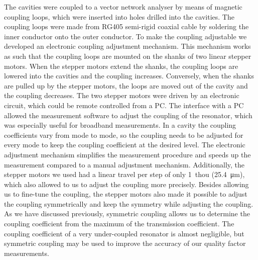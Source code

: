 The cavities were coupled to a vector network analyser by means of magnetic coupling loops, which were inserted into holes drilled into the cavities. The coupling loops were made from RG405 semi-rigid coaxial cable by soldering the inner conductor onto the outer conductor. To make the coupling adjustable we developed an electronic coupling adjustment mechanism. This mechanism works as such that the coupling loops are mounted on the shanks of two linear stepper motors. When the stepper motors extend the shanks, the coupling loops are lowered into the cavities and the coupling increases. Conversely, when the shanks are pulled up by the stepper motors, the loops are moved out of the cavity and the coupling decreases. The two stepper motors were driven by an electronic circuit, which could be remote controlled from a PC. The interface with a PC allowed the measurement software to adjust the coupling of the resonator, which was especially useful for broadband measurements. In a cavity the coupling coefficients vary from mode to mode, so the coupling needs to be adjusted for every mode to keep the coupling coefficient at the desired level. The electronic adjustment mechanism simplifies the measurement procedure and speeds up the measurement compared to a manual adjustment mechanism. Additionally, the stepper motors we used had a linear travel per step of only \SI{1}{thou} (\SI{25,4}{\micro\meter}), which also allowed to us to adjust the coupling more precisely. Besides allowing us to fine-tune the coupling, the stepper motors also made it possible to adjust the coupling symmetrically and keep the symmetry while adjusting the coupling. As we have discussed previously, symmetric coupling allows us to determine the coupling coefficient from the maximum of the transmission coefficient. The coupling coefficient of a very under-coupled resonator is almost negligible, but symmetric coupling may be used to improve the accuracy of our quality factor measurements.


